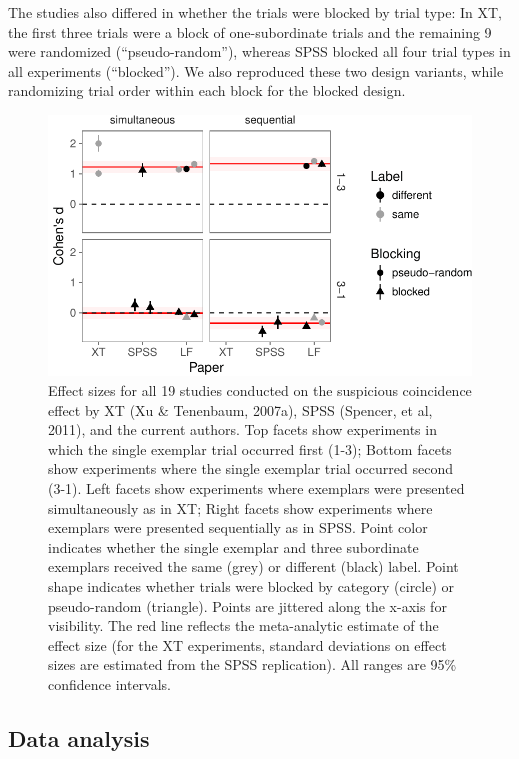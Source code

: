 \documentclass[english,floatsintext,man]{apa6}
\newcounter{author}
\theoremstyle{definition}
\theoremstyle{definition}
\theoremstyle{remark}
\begin{document}
The studies also differed in whether the trials were blocked by trial
type: In XT, the first three trials were a block of one-subordinate
trials and the remaining 9 were randomized (\enquote{pseudo-random}),
whereas SPSS blocked all four trial types in all experiments
(\enquote{blocked}). We also reproduced these two design variants, while
randomizing trial order within each block for the blocked design.

\begin{figure}
\centering
\includegraphics{xtmem_files/figure-latex/unnamed-chunk-4-1.pdf}
\caption{\label{fig:unnamed-chunk-4}Effect sizes for all 19 studies
conducted on the suspicious coincidence effect by XT (Xu \& Tenenbaum,
2007a), SPSS (Spencer, et al, 2011), and the current authors. Top facets
show experiments in which the single exemplar trial occurred first
(1-3); Bottom facets show experiments where the single exemplar trial
occurred second (3-1). Left facets show experiments where exemplars were
presented simultaneously as in XT; Right facets show experiments where
exemplars were presented sequentially as in SPSS. Point color indicates
whether the single exemplar and three subordinate exemplars received the
same (grey) or different (black) label. Point shape indicates whether
trials were blocked by category (circle) or pseudo-random (triangle).
Points are jittered along the x-axis for visibility. The red line
reflects the meta-analytic estimate of the effect size (for the XT
experiments, standard deviations on effect sizes are estimated from the
SPSS replication). All ranges are 95\% confidence intervals.}
\end{figure}

\subsection{Data analysis}\label{data-analysis}
\end{document}
